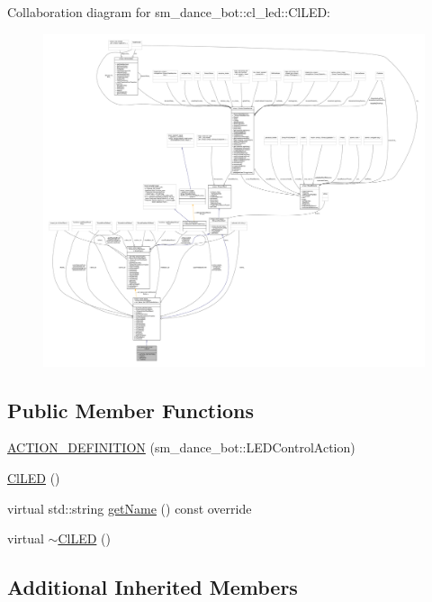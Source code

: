 Collaboration diagram for sm\+\_\+dance\+\_\+bot\+:\+:cl\+\_\+led\+:\+:Cl\+L\+ED\+:\nopagebreak
\begin{figure}[H]
\begin{center}
\leavevmode
\includegraphics[width=350pt]{classsm__dance__bot_1_1cl__led_1_1ClLED__coll__graph}
\end{center}
\end{figure}
\subsection*{Public Member Functions}
\begin{DoxyCompactItemize}
\item 
\hyperlink{classsm__dance__bot_1_1cl__led_1_1ClLED_a810154a450e6239169177a43e7d17394}{A\+C\+T\+I\+O\+N\+\_\+\+D\+E\+F\+I\+N\+I\+T\+I\+ON} (sm\+\_\+dance\+\_\+bot\+::\+L\+E\+D\+Control\+Action)
\item 
\hyperlink{classsm__dance__bot_1_1cl__led_1_1ClLED_a6b01355fcaf2817d9f9694dc2d8c713c}{Cl\+L\+ED} ()
\item 
virtual std\+::string \hyperlink{classsm__dance__bot_1_1cl__led_1_1ClLED_aa0a9fb92df96fb1bbba35c78fbe4119d}{get\+Name} () const override
\item 
virtual \hyperlink{classsm__dance__bot_1_1cl__led_1_1ClLED_add9ff40d28e1d31d77e1a2ff92e79fd2}{$\sim$\+Cl\+L\+ED} ()
\end{DoxyCompactItemize}
\subsection*{Additional Inherited Members}


